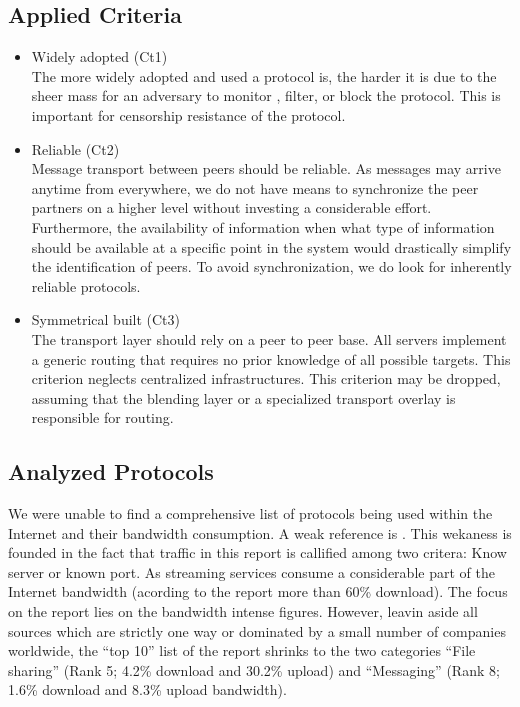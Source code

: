 \subsection{Applied Criteria\label{sec:transportCriteria}}
\begin{itemize}
	\item Widely adopted (Ct1)\\
	The more widely adopted and used a protocol is, the harder it is due to the sheer mass for an adversary to monitor , filter, or block the protocol. This is important for censorship resistance of the protocol. 
	\item Reliable (Ct2)\\
	Message transport between peers should be reliable. As messages may arrive anytime from everywhere, we do not have means to synchronize the peer partners on a higher level without investing a considerable effort. Furthermore, the availability of information when what type of information should be available at a specific point in the system would drastically simplify the identification of peers. To avoid synchronization, we do look for inherently reliable protocols.
	\item Symmetrical built (Ct3)\\
	The transport layer should rely on a peer to peer base. All servers implement a generic routing that requires no prior knowledge of all possible targets. This criterion neglects centralized infrastructures. This criterion may be dropped, assuming that the blending layer or a specialized transport overlay is responsible for routing.
\end{itemize}

\subsection{Analyzed Protocols}
We were unable to find a comprehensive list of protocols being used within the Internet and their bandwidth consumption. A weak reference is \cite{zhou2011examining}. This wekaness is founded in the fact that traffic in this report is callified among two critera: Know server or known port. As streaming services consume a considerable part of the Internet bandwidth (acording to the report more than 60\% download). The focus on the report lies on the bandwidth intense figures. However, leavin aside all sources which are strictly one way or dominated by a small number of companies worldwide, the ``top 10'' list of the report shrinks to the two categories ``File sharing'' (Rank 5; 4.2\% download and 30.2\% upload) and ``Messaging'' (Rank 8; 1.6\% download and 8.3\% upload bandwidth). 

